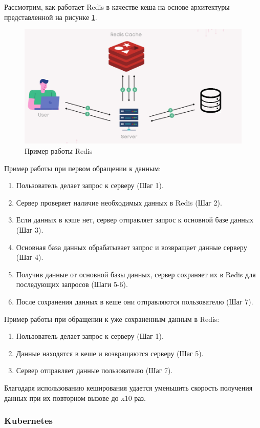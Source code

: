Рассмотрим, как работает Redis в качестве кеша на основе архитектуры представленной на рисунке \ref{fig:-Redis}.
\begin{figure}
	\centering
	\includegraphics[width=0.9\linewidth]{"images/Redis"}
	\caption{Пример работы Redis}
	\label{fig:-Redis}
\end{figure}

Пример работы при первом обращении к данным:
\begin{enumerate}
	\item Пользователь делает запрос к серверу (Шаг 1).
	\item Сервер проверяет наличие необходимых данных в Redis (Шаг 2).
	\item Если данных в кэше нет, сервер отправляет запрос к основной базе данных (Шаг 3).
	\item Основная база данных обрабатывает запрос и возвращает данные серверу (Шаг 4).
	\item Получив данные от основной базы данных, сервер сохраняет их в Redis для последующих запросов (Шаги 5-6).
	\item После сохранения данных в кеше они отправляются пользователю (Шаг 7).
\end{enumerate}

Пример работы при обращении к уже сохраненным данным в Redis:
\begin{enumerate}
	\item Пользователь делает запрос к серверу (Шаг 1).
	\item Данные находятся в кеше и возвращаются серверу (Шаг 5).
	\item Сервер отправляет данные пользователю (Шаг 7).
\end{enumerate}

Благодаря использованию кеширования удается уменьшить скорость получения данных при их повторном вызове до x10 раз.

\subsubsection{Kubernetes}

